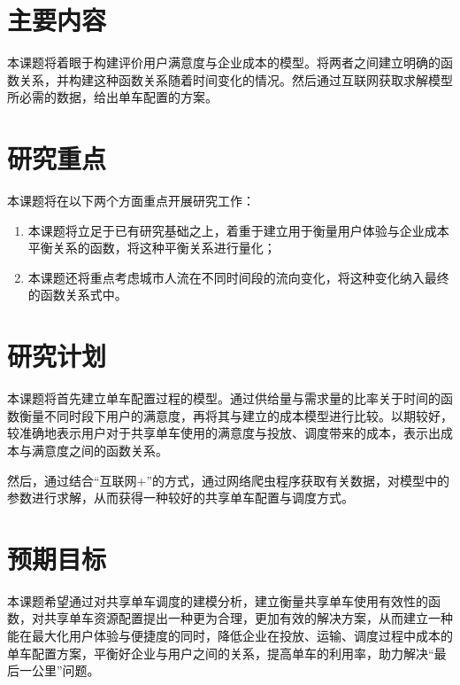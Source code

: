 \documentclass [16pt] {ctexart}
\begin{document}
\section{主要内容}
\par{本课题将着眼于构建评价用户满意度与企业成本的模型。将两者之间建立明确的函数关系，并构建这种函数关系随着时间变化的情况。然后通过互联网获取求解模型所必需的数据，给出单车配置的方案。}

\section{研究重点}
\par{本课题将在以下两个方面重点开展研究工作：}
\begin{enumerate}
    \item {本课题将立足于已有研究基础之上，着重于建立用于衡量用户体验与企业成本平衡关系的函数，将这种平衡关系进行量化；}
    \item{本课题还将重点考虑城市人流在不同时间段的流向变化，将这种变化纳入最终的函数关系式中。}
\end{enumerate}

\section{研究计划}
\par{本课题将首先建立单车配置过程的模型。通过供给量与需求量的比率关于时间的函数衡量不同时段下用户的满意度，再将其与建立的成本模型进行比较。以期较好，较准确地表示用户对于共享单车使用的满意度与投放、调度带来的成本，表示出成本与满意度之间的函数关系。}
\par{然后，通过结合“互联网+”的方式，通过网络爬虫程序获取有关数据，对模型中的参数进行求解，从而获得一种较好的共享单车配置与调度方式。}


\section{预期目标}
\par{本课题希望通过对共享单车调度的建模分析，建立衡量共享单车使用有效性的函数，对共享单车资源配置提出一种更为合理，更加有效的解决方案，从而建立一种能在最大化用户体验与便捷度的同时，降低企业在投放、运输、调度过程中成本的单车配置方案，平衡好企业与用户之间的关系，提高单车的利用率，助力解决“最后一公里”问题。}





\end{document}
